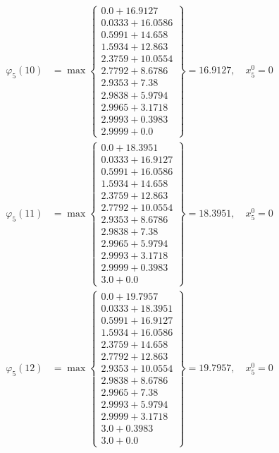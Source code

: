 \documentclass{article}
\begin{document}
\begin{align*}
\varphi_{5}(10) &= \max \left\{ \begin{array}{c}
0.0 + 16.9127 \\
 0.0333 + 16.0586 \\
 0.5991 + 14.658 \\
 1.5934 + 12.863 \\
 2.3759 + 10.0554 \\
 2.7792 + 8.6786 \\
 2.9353 + 7.38 \\
 2.9838 + 5.9794 \\
 2.9965 + 3.1718 \\
 2.9993 + 0.3983 \\
 2.9999 + 0.0
\end{array} \right\}=16.9127, \quad x_{5}^0=0\\
  
\varphi_{5}(11) &= \max \left\{ \begin{array}{c}
0.0 + 18.3951 \\
 0.0333 + 16.9127 \\
 0.5991 + 16.0586 \\
 1.5934 + 14.658 \\
 2.3759 + 12.863 \\
 2.7792 + 10.0554 \\
 2.9353 + 8.6786 \\
 2.9838 + 7.38 \\
 2.9965 + 5.9794 \\
 2.9993 + 3.1718 \\
 2.9999 + 0.3983 \\
 3.0 + 0.0
\end{array} \right\}=18.3951, \quad x_{5}^0=0\\
  
\varphi_{5}(12) &= \max \left\{ \begin{array}{c}
0.0 + 19.7957 \\
 0.0333 + 18.3951 \\
 0.5991 + 16.9127 \\
 1.5934 + 16.0586 \\
 2.3759 + 14.658 \\
 2.7792 + 12.863 \\
 2.9353 + 10.0554 \\
 2.9838 + 8.6786 \\
 2.9965 + 7.38 \\
 2.9993 + 5.9794 \\
 2.9999 + 3.1718 \\
 3.0 + 0.3983 \\
 3.0 + 0.0
\end{array} \right\}=19.7957, \quad x_{5}^0=0\\
  

\end{align*}
\end{document}
